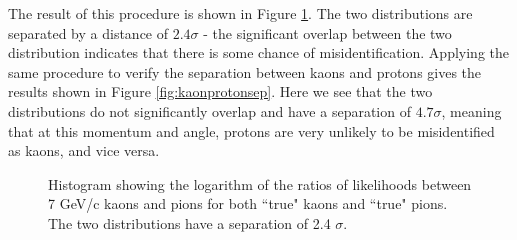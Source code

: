 The result of this procedure is shown in Figure \ref{fig:kaonpionsep}. The two distributions are separated by a distance of $2.4 \sigma$ - the significant overlap between the two distribution indicates that there is some chance of misidentification. Applying the same procedure to verify the separation between kaons and protons gives the results shown in Figure \ref{fig:kaonprotonsep}. Here we see that the two distributions do not significantly overlap and have a separation of $4.7 \sigma$, meaning that at this momentum and angle, protons are very unlikely to be misidentified as kaons, and vice versa.
\begin{figure}[]
\centering
{}
\caption[Particle identification separation for 7 GeV/c pions and kaons]{Histogram showing the logarithm of the ratios of likelihoods between 7 GeV/c kaons and pions for both ``true" kaons and ``true" pions. The two distributions have a separation of 2.4 $\sigma$.}
\label{fig:kaonpionsep} 
\end{figure}

